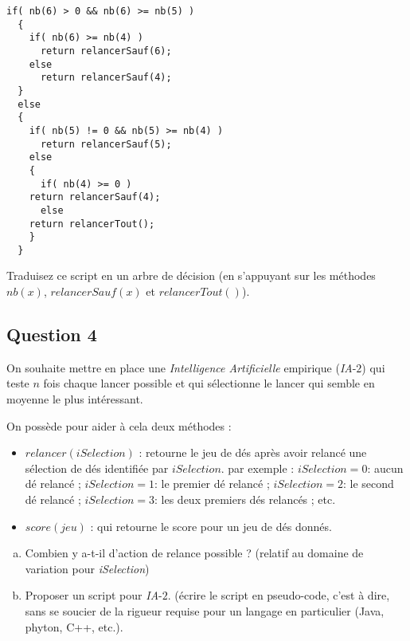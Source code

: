 \documentclass[a4paper, 10pt]{article}
\begin{document}
  \newpage
  
  \begin{lstlisting}[caption={Script IA-1}]
  if( nb(6) > 0 && nb(6) >= nb(5) )
  {
    if( nb(6) >= nb(4) )
      return relancerSauf(6);
    else
      return relancerSauf(4);
  }
  else
  {
    if( nb(5) != 0 && nb(5) >= nb(4) )
      return relancerSauf(5);
    else
    {
      if( nb(4) >= 0 )
	return relancerSauf(4);
      else
	return relancerTout();
    }
  }
  \end{lstlisting}
  
  Traduisez ce script en un arbre de décision (en s'appuyant sur les méthodes $\mathit{nb}(x)$, $\mathit{relancerSauf}(x)$ et $\mathit{relancerTout}()$).

  \subsection*{Question 4}%
  
  On souhaite mettre en place une \emph{Intelligence Artificielle} empirique (\emph{IA}-$2$) qui teste $n$ fois chaque lancer possible et qui sélectionne le lancer qui semble en moyenne le plus intéressant.
  
  On possède pour aider à cela deux méthodes :
  
  \begin{itemize}
  \item $\mathit{relancer}( \mathit{iSelection} )$ : retourne le jeu de dés après avoir relancé une sélection de dés identifiée par $\mathit{iSelection}$. par exemple : $\mathit{iSelection}= 0$: aucun dé relancé ; $\mathit{iSelection}= 1$: le premier dé relancé ; $\mathit{iSelection}= 2$: le second dé relancé ; $\mathit{iSelection}= 3$: les deux premiers dés relancés ; etc. 
  \item $\mathit{score}( \mathit{jeu} )$ : qui retourne le score pour un jeu de dés donnés.
  \end{itemize}
  
  \begin{enumerate}[(a)]
   \item Combien y a-t-il d'action de relance possible ? (relatif au domaine de variation pour \emph{iSelection})
   \item Proposer un script pour \emph{IA}-$2$. (écrire le script en pseudo-code, c'est à dire, sans se soucier de la rigueur requise pour un langage en particulier (Java, phyton, C++, etc.).
  \end{enumerate}
\end{document}
